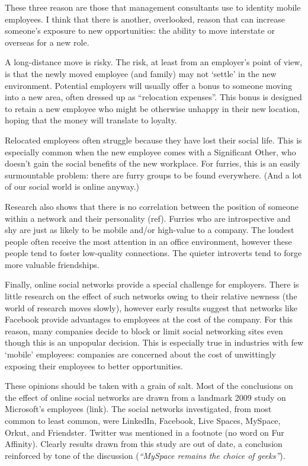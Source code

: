 These three reason are those that management consultants use to identity mobile employees. I think that there is another, overlooked, reason that can increase someone's exposure to new opportunities: the ability to move interstate or overseas for a new role.

A long-distance move is risky. The risk, at least from an employer's point of view, is that the newly moved employee (and family) may not `settle' in the new environment. Potential employers will usually offer a bonus to someone moving into a new area, often dressed up as ``relocation expenses''. This bonus is designed to retain a new employee who might be otherwise unhappy in their new location, hoping that the money will translate to loyalty.

Relocated employees often struggle because they have lost their social life. This is especially common when the new employee comes with a Significant Other, who doesn't gain the social benefits of the new workplace. For furries, this is an easily surmountable problem: there are furry groups to be found everywhere. (And a lot of our social world is online anyway.)

Research also shows that there is no correlation between the position of someone within a network and their personality (ref). Furries who are introspective and shy are just as likely to be mobile and/or high-value to a company. The loudest people often receive the most attention in an office environment, however these people tend to foster low-quality connections. The quieter introverts tend to forge more valuable friendships.

Finally, online social networks provide a special challenge for employers. There is little research on the effect of such networks owing to their relative newness (the world of research moves slowly), however early results suggest that networks like Facebook provide advantages to employees at the cost of the company. For this reason, many companies decide to block or limit social networking sites even though this is an unpopular decision. This is especially true in industries with few `mobile' employees: companies are concerned about the cost of unwittingly exposing their employees to better opportunities.

These opinions should be taken with a grain of salt. Most of the conclusions on the effect of online social networks are drawn from a landmark 2009 study on Microsoft's employees (link). The social networks investigated, from most common to least common, were LinkedIn, Facebook, Live Spaces, MySpace, Orkut, and Friendster. Twitter was mentioned in a footnote (no word on Fur Affinity). Clearly results drawn from this study are out of date, a conclusion reinforced by tone of the discussion (\textit{``MySpace remains the choice of geeks''}).

